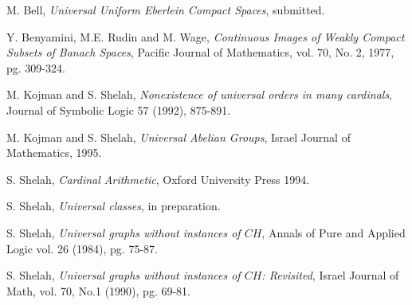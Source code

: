 \begin{thebibliography}{xxxxxxx}

 M. Bell, {\em Universal Uniform Eberlein Compact Spaces},
submitted.

 Y. Benyamini, M.E. Rudin and M. Wage, {\em Continuous
Images of Weakly Compact Subsets of Banach Spaces}, Pacific Journal of
Mathematics, vol. 70, No. 2, 1977, pg. 309-324.

 M. Kojman and S. Shelah, {\em Nonexistence of universal
orders in many cardinals}, Journal of Symbolic Logic 57 (1992), 875-891.

 M. Kojman and S. Shelah, {\em Universal Abelian
Groups}, Israel Journal of Mathematics, 1995.

 S. Shelah, {\em Cardinal Arithmetic}, Oxford University
Press 1994.

 S. Shelah, {\em Universal classes}, in preparation.

 S. Shelah, {\em Universal graphs without instances of
$CH$}, Annals of Pure and Applied Logic vol. 26 (1984), pg. 75-87.

 S. Shelah, {\em Universal graphs without instances of
$CH$: Revisited}, Israel Journal of Math, vol. 70, No.1 (1990), pg. 69-81.

\end{thebibliography}
%






